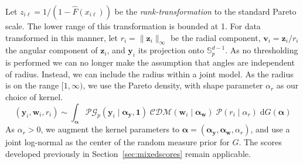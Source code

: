Let $z_{i\ell} = 1/(1 - \hat{F}(x_{i\ell}))$ be the 
    \emph{rank-transformation} to the standard Pareto scale.  The lower range 
    of this transformation is bounded at 1. For data transformed in this manner, 
    let $r_i = \lVert \bm{z}_i\rVert_{\infty}$ be the radial component, 
    $\bm{v}_i = \bm{z}_i/r_i$ the angular component of $\bm{z}_i$, and 
    $\bm{y}_i$ its projection onto $\mathbb{S}_p^{d-1}$.  
    As no thresholding is performed we can no longer make the assumption that 
    angles are independent of radius.  Instead, we can include the radius 
    within a joint model.  As the radius is on the range $[1,\infty)$, 
    we use the Pareto density, with shape parameter $\alpha_r$ as our choice 
    of kernel.  
    \begin{equation}
        \label{model:rank}
        (\bm{y}_i,\bm{w}_i,r_i) \sim \int_{\bm{\alpha}}
            \mathcal{PG}_p(\bm{y}_i\mid\bm{\alpha}_{\bm{y}}, \bm{1})\;
            \mathcal{CDM}(\bm{w}_i\mid\bm{\alpha}_{\bm{w}})\;
            \mathcal{P}(r_i\mid\alpha_r)\;
            \text{d}G(\bm{\alpha})
    \end{equation}
    As $\alpha_r > 0$, we augment the kernel parameters to $\bm{\alpha}= 
    (\bm{\alpha}_{\bm{y}}, \bm{\alpha}_{\bm{w}}, \alpha_r)$, and use a joint log-normal
    as the center of the random measure prior for $G$. The scores developed previously in 
    Section~\ref{sec:mixedscores} remain applicable.

